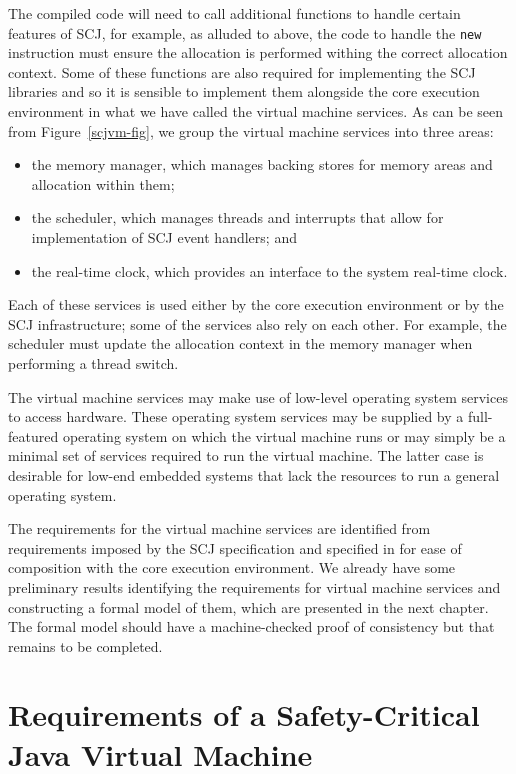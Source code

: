 \documentclass[a4paper,10pt]{report}
\begin{document}
The compiled code will need to call additional functions to handle certain
features of SCJ, for example, as alluded to above, the code to handle the
\texttt{new} instruction must ensure the allocation is performed withing the
correct allocation context.  Some of these functions are also required for
implementing the SCJ libraries and so it is sensible to implement them alongside
the core execution environment in what we have called the virtual machine
services.  As can be seen from Figure~\ref{scjvm-fig}, we group the virtual
machine services into three areas:
\begin{itemize}
\item the memory manager, which manages backing stores for memory areas and
  allocation within them;
\item the scheduler, which manages threads and interrupts that allow for
  implementation of SCJ event handlers; and
\item the real-time clock, which provides an interface to the system real-time
  clock.
\end{itemize}
Each of these services is used either by the core execution environment or by
the SCJ infrastructure; some of the services also rely on each other.  For
example, the scheduler must update the allocation context in the memory manager
when performing a thread switch.

The virtual machine services may make use of low-level operating system
services to access hardware.  These operating system services may be supplied by
a full-featured operating system on which the virtual machine runs or may simply
be a minimal set of services required to run the virtual machine.  The latter
case is desirable for low-end embedded systems that lack the resources to
run a general operating system.

The requirements for the virtual machine services are identified from
requirements imposed by the SCJ specification and specified in \Circus{} for
ease of composition with the core execution environment.  We already have some
preliminary results identifying the requirements for virtual machine services
and constructing a formal model of them, which are presented in the next
chapter.  The formal model should have a machine-checked proof of consistency
but that remains to be completed.

\chapter{Requirements of a Safety-Critical Java Virtual Machine}
\label{requirements-chapter}
\end{document}
